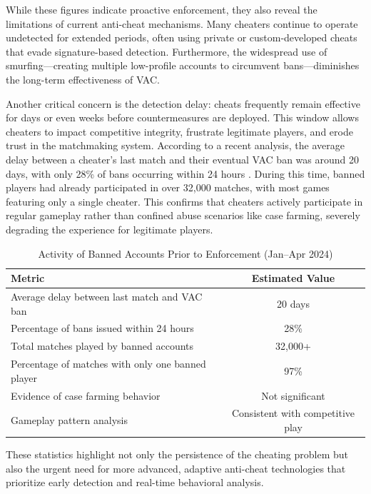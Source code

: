 While these figures indicate proactive enforcement, they also reveal the limitations of current anti-cheat mechanisms. Many cheaters continue to operate undetected for extended periods, often using private or custom-developed cheats that evade signature-based detection. Furthermore, the widespread use of smurfing—creating multiple low-profile accounts to circumvent bans—diminishes the long-term effectiveness of VAC.

Another critical concern is the detection delay: cheats frequently remain effective for days or even weeks before countermeasures are deployed. This window allows cheaters to impact competitive integrity, frustrate legitimate players, and erode trust in the matchmaking system. According to a recent analysis, the average delay between a cheater’s last match and their eventual VAC ban was around 20 days, with only 28\% of bans occurring within 24 hours \cite{bo3gg2024}. During this time, banned players had already participated in over 32,000 matches, with most games featuring only a single cheater. This confirms that cheaters actively participate in regular gameplay rather than confined abuse scenarios like case farming, severely degrading the experience for legitimate players.

\begin{table}[H]
  \centering
  \small %
  \setlength{\tabcolsep}{6pt} %
  \caption{Activity of Banned Accounts Prior to Enforcement (Jan–Apr 2024)}
  \label{tab:cheater-impact}
  \begin{tabular}{|p{5.2cm}|c|}
  \hline
  \textbf{Metric} & \textbf{Estimated Value} \\
  \hline
  Average delay between last match and VAC ban & 20 days \\
  \hline
  Percentage of bans issued within 24 hours & 28\% \\
  \hline
  Total matches played by banned accounts & 32,000+ \\
  \hline
  Percentage of matches with only one banned player & 97\% \\
  \hline
  Evidence of case farming behavior & Not significant \\
  \hline
  Gameplay pattern analysis & Consistent with competitive play \\
  \hline
  \end{tabular}
  \end{table}  

These statistics highlight not only the persistence of the cheating problem but also the urgent need for more advanced, adaptive anti-cheat technologies that prioritize early detection and real-time behavioral analysis.



